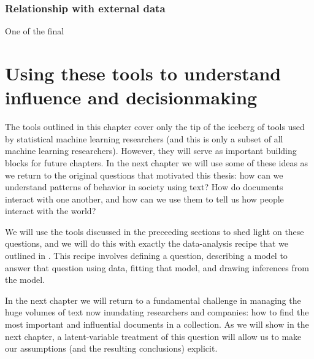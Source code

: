 \subsubsection{Relationship with external data}
One of the final 

\section{Using these tools to understand influence and decisionmaking}

The tools outlined in this chapter cover only the tip of the iceberg
of tools used by statistical machine learning researchers (and this is
only a subset of all machine learning researchers).  However, they
will serve as important building blocks for future chapters.  In the
next chapter we will use some of these ideas as we return to the
original questions that motivated this thesis: how can we understand
patterns of behavior in society using text?  How do documents interact
with one another, and how can we use them to tell us how people
interact with the world?

We will use the tools discussed in the preceeding sections to shed
light on these questions, and we will do this with exactly the
data-analysis recipe that we outlined in
.  This recipe involves defining a question,
describing a model to answer that question using data, fitting that
model, and drawing inferences from the model.
 
In the next chapter we will return to a fundamental challenge in
managing the huge volumes of text now inundating researchers and
companies: how to find the most important and influential documents in
a collection.  As we will show in the next chapter, a latent-variable
treatment of this question will allow us to make our assumptions (and
the resulting conclusions) explicit.

